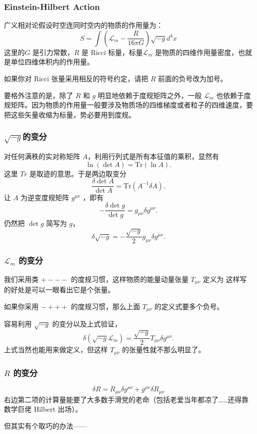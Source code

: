 \documentclass[CJK,13pt]{beamer}
\begin{document}
  \begin{frame}
    \frametitle{Einstein-Hilbert Action}
    广义相对论假设时空连同时空内的物质的作用量为：
    $$ S = \int \left(\mathcal{L}_m -\frac{R}{16\pi G}\right) \sqrt{-g} d^4x $$
    这里的$G$ 是引力常数，$R$ 是 Ricci 标量，标量$\mathcal{L}_m$ 是物质的四维作用量密度，也就是单位四维体积内的作用量。

    {\scriptsize 如果你对 Ricci 张量采用相反的符号约定，请把 $R$ 前面的负号改为加号。}

    \skipline

    要格外注意的是，除了 $R$ 和 $g$ 明显地依赖于度规矩阵之外，一般 $\mathcal{L}_m$ 也依赖于度规矩阵。因为物质的作用量一般要涉及物质场的四维梯度或者粒子的四维速度，要把这些矢量收缩为标量，势必要用到度规。
  \end{frame}


  \begin{frame}
    \frametitle{$\sqrt{-g}$的变分}
    对任何满秩的实对称矩阵 $A$，利用行列式是所有本征值的乘积，显然有
    $$\ln (\det A) = \mathrm{Tr}\left(\ln A\right).$$
    这里 $Tr$ 是取迹的意思。于是两边取变分
    $$ \frac{\delta \det A}{\det A} = \mathrm{Tr}\left(A^{-1}\delta A\right).$$
    让 $A$ 为逆变度规矩阵 $g^{\mu\nu}$ ，即有
    $$ -\frac{\delta \det g}{\det g} = g_{\mu\nu}\delta g^{\mu\nu}.$$
    仍然把 $\det g$ 简写为 $g$，
   {\blue $$ \delta \sqrt{-g} = -\frac{\sqrt{-g}}{2} g_{\mu\nu}\delta g^{\mu\nu}.$$}
  \end{frame}
  

  \begin{frame}
    \frametitle{ $\mathcal{L}_m$ 的变分}
    我们采用类 $+---$ 的度规习惯，这样物质的能量动量张量 $T_{\mu\nu}$ 定义为
    这样写的好处是可以一眼看出它是个张量。

    {\scriptsize 如果你采用 $-+++$ 的度规习惯，那么上面 $T_{\mu\nu}$ 的定义式要多个负号。}

    \skiplines
    
    容易利用 $\sqrt{-g}$ 的变分以及上式验证，
    {\blue $$\delta \left(\sqrt{-g}\mathcal{L}_m \right) = \frac{\sqrt{-g}}{2}T_{\mu\nu}\delta g^{\mu\nu}.$$}
    上式当然也能用来做定义，但这样 $T_{\mu\nu}$ 的张量性就不那么明显了。
  \end{frame}


  \begin{frame}
    \frametitle{$R$ 的变分}
    $$\delta R = R_{\mu\nu}\delta g^{\mu\nu} + g^{\mu\nu}\delta R_{\mu\nu}$$
    右边第二项的计算量能要了大多数手滑党的老命（包括老爱当年都凉了……还得靠数学巨佬 Hilbert 出场）。


    \skiplines
    
    但其实有个取巧的办法——

  \end{frame}
  
\end{document}
